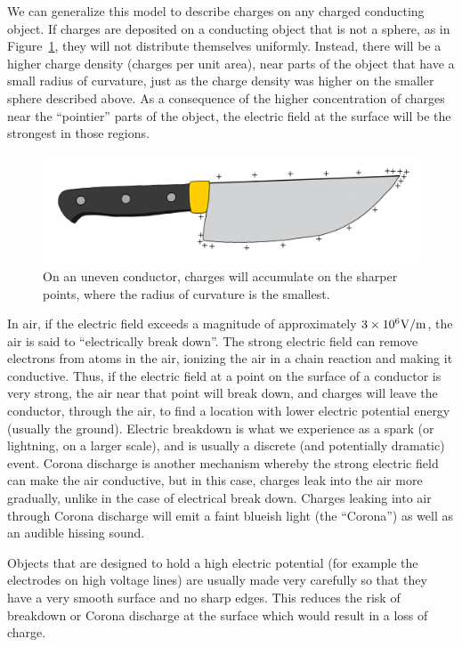 We can generalize this model to describe charges on any charged conducting object. If charges are deposited on a conducting object that is not a sphere, as in Figure~\ref{fig:potential:chargeblob}, they will not distribute themselves uniformly. Instead, there will be a higher charge density (charges per unit area), near parts of the object that have a small radius of curvature, just as the charge density was higher on the smaller sphere described above. As a consequence of the higher concentration of charges near the ``pointier'' parts of the object, the electric field at the surface will be the strongest in those regions.

\begin{figure}[!htbp]
\centering
\includegraphics[width=0.65\linewidth]{files/chargeblob-18e4c296aa731c7a6315c4332e948ff6.png}
\caption[]{On an uneven conductor, charges will accumulate on the sharper points, where the radius of curvature is the smallest.}
\label{fig:potential:chargeblob}
\end{figure}

In air, if the electric field exceeds a magnitude of approximately $3\times 10^{6} {\rm V/m}$, the air is said to ``electrically break down''. The strong electric field can remove electrons from atoms in the air, ionizing the air in a chain reaction and making it conductive. Thus, if the electric field at a point on the surface of a conductor is very strong, the air near that point will break down, and charges will leave the conductor, through the air, to find a location with lower electric potential energy (usually the ground). Electric breakdown is what we experience as a spark (or lightning, on a larger scale), and is usually a discrete (and potentially dramatic) event. Corona discharge is another mechanism whereby the strong electric field can make the air conductive, but in this case, charges leak into the air more gradually, unlike in the case of electrical break down. Charges leaking into air through Corona discharge will emit a faint blueish light (the ``Corona'') as well as an audible hissing sound.

Objects that are designed to hold a high electric potential (for example the electrodes on high voltage lines) are usually made very carefully so that they have a very smooth surface and no sharp edges. This reduces the risk of breakdown or Corona discharge at the surface which would result in a loss of charge.

